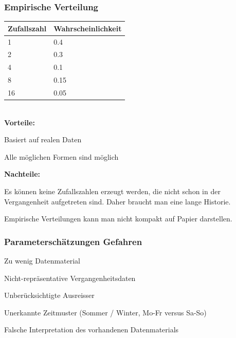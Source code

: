 \subsubsection{Empirische Verteilung}
\begin{multicols}{2}
	\begin{tabular}{|l|l|}
		\hline
		\textbf{Zufallszahl} & \textbf{Wahrscheinlichkeit} \\ \hline
		1 & 0.4 \\ \hline
		2 & 0.3 \\ \hline
		4 & 0.1 \\ \hline
		8 & 0.15 \\ \hline
		16 & 0.05 \\ \hline
	\end{tabular} \\
	\textbf{Vorteile:}
	\begin{compactitem}
		\item Basiert auf realen Daten
		\item Alle möglichen Formen sind möglich
	\end{compactitem}	
	\textbf{Nachteile:}
	\begin{compactitem}
		\item Es können keine Zufallszahlen erzeugt werden, die nicht schon in der Vergangenheit aufgetreten sind. Daher braucht man eine lange	Historie.
		\item Empirische Verteilungen kann man nicht kompakt auf Papier darstellen.
	\end{compactitem}
\end{multicols}

\subsubsection{Parameterschätzungen Gefahren}
\begin{multicols}{2}
	\begin{compactitem}
		\item Zu wenig Datenmaterial
		\item Nicht-repräsentative Vergangenheitsdaten
		\item Unberücksichtigte Ausreisser
		\item Unerkannte Zeitmuster (Sommer / Winter, Mo-Fr versus Sa-So)
		\item Falsche Interpretation des vorhandenen Datenmaterials
	\end{compactitem}
\end{multicols}

